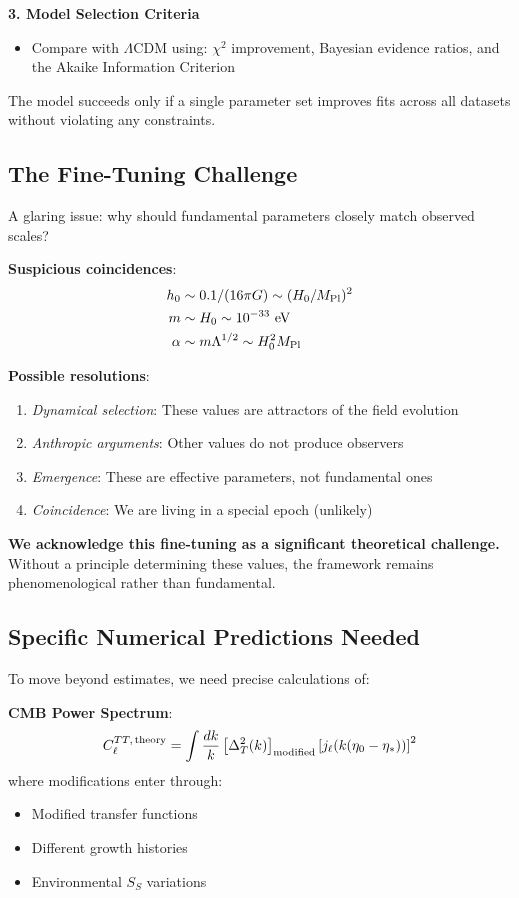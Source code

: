 \documentclass[12pt]{article}
\begin{document}
\textbf{3. Model Selection Criteria}
\begin{itemize}
    \item Compare with $\Lambda$CDM using: $\chi^2$ improvement, Bayesian evidence ratios, and the Akaike Information Criterion
\end{itemize}
The model succeeds only if a single parameter set improves fits across all datasets without violating any constraints.

\subsection{The Fine-Tuning Challenge}

A glaring issue: why should fundamental parameters closely match observed scales?

\textbf{Suspicious coincidences}:
\begin{align*}
    h_0 &\sim 0.1/(16\pi G) \sim (H_0/M_{\rm Pl})^2 \\
    m &\sim H_0 \sim 10^{-33}~{\rm eV} \\
    \alpha &\sim m\Lambda^{1/2} \sim H_0^2 M_{\rm Pl}
\end{align*}

\textbf{Possible resolutions}:
\begin{enumerate}
    \item \textit{Dynamical selection}: These values are attractors of the field evolution
    \item \textit{Anthropic arguments}: Other values do not produce observers
    \item \textit{Emergence}: These are effective parameters, not fundamental ones
    \item \textit{Coincidence}: We are living in a special epoch (unlikely)
\end{enumerate}

\textbf{We acknowledge this fine-tuning as a significant theoretical challenge.} Without a principle determining these values, the framework remains phenomenological rather than fundamental.

\subsection{Specific Numerical Predictions Needed}

To move beyond estimates, we need precise calculations of:

\textbf{CMB Power Spectrum}:
\begin{equation}
    C_\ell^{TT,\, \rm theory} = \int \frac{dk}{k} \left[ \Delta_T^2(k) \right]_{\rm modified} \left[ j_\ell(k(\eta_0-\eta_*)) \right]^2
\end{equation}
where modifications enter through:
\begin{itemize}
    \item Modified transfer functions
    \item Different growth histories
    \item Environmental $S_S$ variations
\end{itemize}
\end{document}
